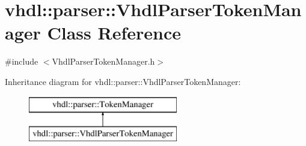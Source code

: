 \hypertarget{classvhdl_1_1parser_1_1_vhdl_parser_token_manager}{}\section{vhdl\+::parser\+::Vhdl\+Parser\+Token\+Manager Class Reference}
\label{classvhdl_1_1parser_1_1_vhdl_parser_token_manager}


{\ttfamily \#include $<$Vhdl\+Parser\+Token\+Manager.\+h$>$}

Inheritance diagram for vhdl\+::parser\+::Vhdl\+Parser\+Token\+Manager\+:\begin{figure}[H]
\begin{center}
\leavevmode
\includegraphics[height=2.000000cm]{classvhdl_1_1parser_1_1_vhdl_parser_token_manager}
\end{center}
\end{figure}
